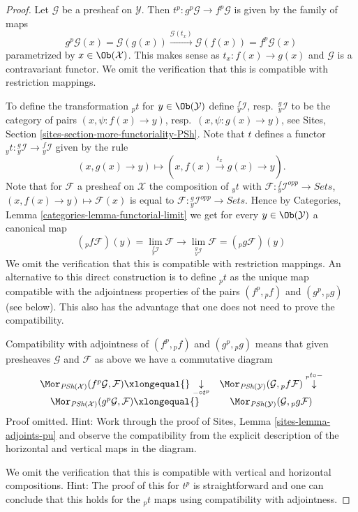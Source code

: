 \begin{proof}
Let $\mathcal{G}$ be a presheaf on $\mathcal{Y}$. Then
$t^p : g^p\mathcal{G} \to f^p\mathcal{G}$ is given by the family
of maps
$$
g^p\mathcal{G}(x) = \mathcal{G}(g(x))
\xrightarrow{\mathcal{G}(t_x)}
\mathcal{G}(f(x)) = f^p\mathcal{G}(x)
$$
parametrized by $x \in \Ob(\mathcal{X})$. This makes sense as
$t_x : f(x) \to g(x)$ and $\mathcal{G}$ is a contravariant functor.
We omit the verification that this is compatible with restriction
mappings.

\medskip\noindent
To define the transformation ${}_pt$ for $y \in \Ob(\mathcal{Y})$
define ${}_y^f\mathcal{I}$, resp.\ ${}_y^g\mathcal{I}$ to be the category
of pairs $(x, \psi : f(x) \to y)$, resp.\ $(x, \psi : g(x) \to y)$, see
Sites, Section \ref{sites-section-more-functoriality-PSh}.
Note that $t$ defines a functor
${}_yt : {}_y^g\mathcal{I} \to {}_y^f\mathcal{I}$
given by the rule
$$
(x, g(x) \to y) \longmapsto (x, f(x) \xrightarrow{t_x} g(x) \to y).
$$
Note that for $\mathcal{F}$ a presheaf on $\mathcal{X}$ the composition
of ${}_yt$ with $\mathcal{F} : {}_y^f\mathcal{I}^{opp} \to \textit{Sets}$,
$(x, f(x) \to y) \mapsto \mathcal{F}(x)$ is equal to
$\mathcal{F} : {}_y^g\mathcal{I}^{opp} \to \textit{Sets}$. Hence by
Categories, Lemma \ref{categories-lemma-functorial-limit}
we get for every $y \in \Ob(\mathcal{Y})$ a canonical map
$$
({}_pf\mathcal{F})(y) = \lim_{{}_y^f\mathcal{I}} \mathcal{F}
\longrightarrow
\lim_{{}_y^g\mathcal{I}} \mathcal{F} = ({}_pg\mathcal{F})(y)
$$
We omit the verification that this is compatible with restriction
mappings. An alternative to this direct construction is to define
${}_pt$ as the unique map compatible with the adjointness properties
of the pairs $(f^p, {}_pf)$ and $(g^p, {}_pg)$ (see below). This also
has the advantage that one does not need to prove the compatibility.

\medskip\noindent
Compatibility with adjointness of $(f^p, {}_pf)$ and $(g^p, {}_pg)$ means
that given presheaves $\mathcal{G}$ and $\mathcal{F}$ as above we have
a commutative diagram
$$
\begin{array}{cc}\Mor_{\textit{PSh}(\mathcal{X})}(f^p\mathcal{G}, \mathcal{F})
\xlongequal{}\underset{- \circ t^p}{\downarrow} & \Mor_{\textit{PSh}(\mathcal{Y})}(\mathcal{G}, {}_pf\mathcal{F})
\overset{{}_pt \circ -}{\downarrow} \\ \Mor_{\textit{PSh}(\mathcal{X})}(g^p\mathcal{G}, \mathcal{F})
\xlongequal{} & \Mor_{\textit{PSh}(\mathcal{Y})}(\mathcal{G}, {}_pg\mathcal{F})\end{array}
$$
Proof omitted. Hint: Work through the proof of
Sites, Lemma \ref{sites-lemma-adjoints-pu}
and observe the compatibility from the explicit description of the
horizontal and vertical maps in the diagram.

\medskip\noindent
We omit the verification that this is compatible with vertical and horizontal
compositions. Hint: The proof of this for $t^p$ is straightforward and
one can conclude that this holds for the ${}_pt$ maps using compatibility
with adjointness.
\end{proof}


